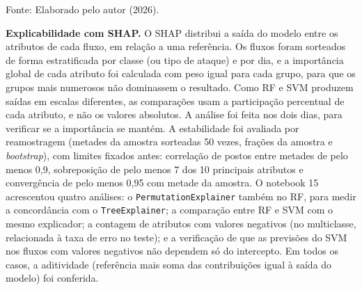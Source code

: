 \documentclass[
    12pt,                %
    openright,           %
    oneside,             %
    a4paper,             %
    english,             %
    brazil               %
]{abntex2}
\begin{document}
\begin{table}
\centering
\caption{Cenários dos experimentos de explicabilidade (SHAP)}
\label{tab:cenarios-experimentos}
\footnotesize
{}
\par\smallskip
Fonte: Elaborado pelo autor (2026).
\end{table}

\textbf{Explicabilidade com SHAP.} O SHAP distribui a saída do modelo entre os atributos de cada fluxo, em relação a uma referência. Os fluxos foram sorteados de forma estratificada por classe (ou tipo de ataque) e por dia, e a importância global de cada atributo foi calculada com peso igual para cada grupo, para que os grupos mais numerosos não dominassem o resultado. Como RF e SVM produzem saídas em escalas diferentes, as comparações usam a participação percentual de cada atributo, e não os valores absolutos. A análise foi feita nos dois dias, para verificar se a importância se mantém. A estabilidade foi avaliada por reamostragem (metades da amostra sorteadas 50 vezes, frações da amostra e \textit{bootstrap}), com limites fixados antes: correlação de postos entre metades de pelo menos 0,9, sobreposição de pelo menos 7 dos 10 principais atributos e convergência de pelo menos 0,95 com metade da amostra. O notebook 15 acrescentou quatro análises: o \texttt{PermutationExplainer} também no RF, para medir a concordância com o \texttt{TreeExplainer}; a comparação entre RF e SVM com o mesmo explicador; a contagem de atributos com valores negativos (no multiclasse, relacionada à taxa de erro no teste); e a verificação de que as previsões do SVM nos fluxos com valores negativos não dependem só do intercepto. Em todos os casos, a aditividade (referência mais soma das contribuições igual à saída do modelo) foi conferida.
\end{document}
